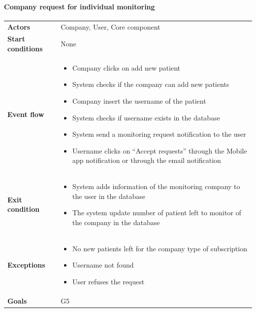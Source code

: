 \paragraph{Company request for individual monitoring}
\begin{center}
\begin{table}[H]
\centering
\begin{tabular}{l|p{}}
\textbf{Actors} & Company, User, Core component \\
\textbf{Start conditions} & None \\
\textbf{Event flow}  & 

\begin{minipage}[t]{0.7\textwidth}
    \begin{itemize}
        \item Company clicks on add new patient 
\item System checks if the company can add new patients 
\item Company insert the username of the patient 
\item System checks if username exists in the database
\item System send a monitoring request notification to the user 
\item Username clicks on “Accept requests” through the Mobile app notification or through the email notification 
    \end{itemize}
    
\end{minipage}

\\
\textbf{Exit condition} & 
\begin{minipage}[t]{0.7\textwidth}
    \begin{itemize}
       \item System adds information of the monitoring company to the user in the database
\item The system update number of patient left to monitor of the company in the database

    \end{itemize}
    
\end{minipage}
\\
\textbf{Exceptions} & 

\begin{minipage}[t]{0.7\textwidth}
    \begin{itemize}
       \item No new patients left for the company type of subscription
\item Username not found
\item User refuses the request

    \end{itemize}
    
\end{minipage}
\\
\textbf{Goals} & G5 
\end{tabular}

\end{table}
\end{center}

